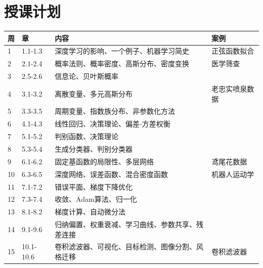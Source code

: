 \documentclass[10pt,a4paper]{article}
\begin{document}
\section*{授课计划}

\begin{table}[ht!]\centering
\begin{tabular}
{|p{0.8cm}|p{1.4cm}|p{8.5cm}|p{2.6cm}|} \hline 
周	&章	        & 内容     & 案例 \\ \hline\hline  
1	&1.1-1.3    & 深度学习的影响、一个例子、机器学习简史  & 正弦函数拟合 \\  \hline
2	&2.1-2.4    & 概率法则、概率密度、高斯分布、密度变换 & 医学筛查 \\  \hline
3	&2.5-2.6    & 信息论、贝叶斯概率      &  \\  \hline
4	&3.1-3.2	& 离散变量、多元高斯分布      & 老忠实喷泉数据 \\  \hline
5	&3.3-3.5	& 周期变量、指数族分布、非参数化方法      &  \\  \hline
6	&4.1-4.3	& 线性回归、决策理论、偏差-方差权衡      &  \\  \hline
7	&5.1-5.2	& 判别函数、决策理论      &  \\  \hline
8	&5.3-5.4	& 生成分类器、判别分类器      &  \\  \hline
9	&6.1-6.2	& 固定基函数的局限性、多层网络	& 鸢尾花数据 \\  \hline
10	&6.3-6.5	& 深度网络、误差函数、混合密度函数	& 机器人运动学 \\  \hline
11	&7.1-7.2	& 错误平面、梯度下降优化	& \\  \hline
12	&7.3-7.4	& 收敛、Adam算法、归一化	& \\  \hline
13	&8.1-8.2	& 梯度计算、自动微分法	& \\  \hline
14	&9.1-9.6	& 归纳偏置、权重衰减、学习曲线、参数共享、残差连接	& \\  \hline
15	&10.1-10.6	& 卷积滤波器、可视化、目标检测、图像分割、风格迁移	& 卷积滤波器 \\  \hline
\end{tabular}
\end{table}


\end{document}
